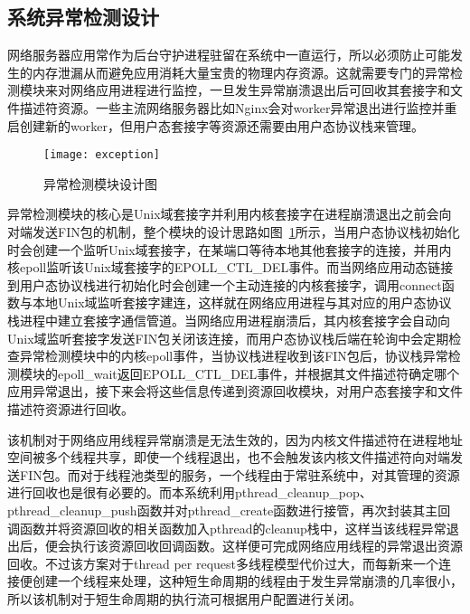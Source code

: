 \subsection{系统异常检测设计}

网络服务器应用常作为后台守护进程驻留在系统中一直运行，所以必须防止可能发生的内存泄漏从而避免应用消耗大量宝贵的物理内存资源。这就需要专门的异常检测模块来对网络应用进程进行监控，一旦发生异常崩溃退出后可回收其套接字和文件描述符资源。一些主流网络服务器比如Nginx会对worker异常退出进行监控并重启创建新的worker，但用户态套接字等资源还需要由用户态协议栈来管理。

\vspace{-10pt}
\begin{figure}[H] %
  \centering
  \texttt{[image: exception]}
  \caption{异常检测模块设计图}
  \label{fig:exception}
\end{figure}
\vspace{-10pt}

异常检测模块的核心是Unix域套接字并利用内核套接字在进程崩溃退出之前会向对端发送FIN包的机制，整个模块的设计思路如图~\ref{fig:exception}所示，当用户态协议栈初始化时会创建一个监听Unix域套接字，在某端口等待本地其他套接字的连接，并用内核epoll监听该Unix域套接字的EPOLL\_CTL\_DEL事件。而当网络应用动态链接到用户态协议栈进行初始化时会创建一个主动连接的内核套接字，调用connect函数与本地Unix域监听套接字建连，这样就在网络应用进程与其对应的用户态协议栈进程中建立套接字通信管道。当网络应用进程崩溃后，其内核套接字会自动向Unix域监听套接字发送FIN包关闭该连接，而用户态协议栈后端在轮询中会定期检查异常检测模块中的内核epoll事件，当协议栈进程收到该FIN包后，协议栈异常检测模块的epoll\_wait返回EPOLL\_CTL\_DEL事件，并根据其文件描述符确定哪个应用异常退出，接下来会将这些信息传递到资源回收模块，对用户态套接字和文件描述符资源进行回收。

该机制对于网络应用线程异常崩溃是无法生效的，因为内核文件描述符在进程地址空间被多个线程共享，即使一个线程退出，也不会触发该内核文件描述符向对端发送FIN包。而对于线程池类型的服务，一个线程由于常驻系统中，对其管理的资源进行回收也是很有必要的。而本系统利用pthread\_cleanup\_pop、pthread\_cleanup\_push函数并对pthread\_create函数进行接管，再次封装其主回调函数并将资源回收的相关函数加入pthread的cleanup栈中，这样当该线程异常退出后，便会执行该资源回收回调函数。这样便可完成网络应用线程的异常退出资源回收。不过该方案对于thread per request多线程模型代价过大，而每新来一个连接便创建一个线程来处理，这种短生命周期的线程由于发生异常崩溃的几率很小，所以该机制对于短生命周期的执行流可根据用户配置进行关闭。